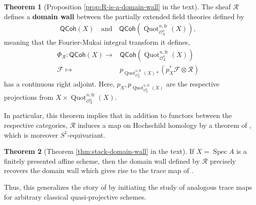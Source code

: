 \documentclass{article}
\numberwithin{equation}{section}
\theoremstyle{quest}
\theoremstyle{definition}
\newtheorem{thm}{Theorem}[section]
\theoremstyle{remark}
\DeclareMathOperator{\Spec}{Spec}
\DeclareMathOperator{\Quot}{Quot}
\begin{document}
\begin{thm}[Proposition \ref{prop:R-is-a-domain-wall} in the text]
	The sheaf $\mathscr{R}$ defines a \textbf{domain wall} between the partially extended field theories defined by
\begin{align*}
	\mathsf{QCoh}(X)\quad\text{and}\quad \mathsf{QCoh}(\Quot^{n,\text{fr}}_{\mathscr{O}_X^n}(X)),
\end{align*}
meaning that the Fourier-Mukai integral transform it defines,
\begin{align*}
	\Phi_{\mathscr{R}}:\mathsf{QCoh}(X)\to &\mathsf{QCoh}(\Quot^{n,\text{fr}}_{\mathscr{O}_X^n}(X))\\
	\mathscr{F}\mapsto &p_{\Quot^{n,\text{fr}}_{\mathscr{O}_X^n}(X)*}(p_X^*\mathscr{F}\otimes \mathscr{R})
\end{align*} 
has a continuous right adjoint. Here, $p_X,p_{\Quot^{n,\text{fr}}_{\mathscr{O}_X^n}(X)}$ are the respective projections from $X\times \Quot^{n,\text{fr}}_{\mathscr{O}_X^n}(X)$.
\end{thm} 
In particular, this theorem implies that in addition to functors between the respective categories, $\mathscr{R}$ induces a map on Hochschild homology by a theorem of \cite{nonlinear-trace}, which is moreover $S^1$-equivariant.
 
\begin{thm}[Theorem \ref{thm:stack-domain-wall} in the text]
	If $X=\Spec A$ is a finitely presented affine scheme, then the domain wall defined by $\mathscr{R}$ precisely recovers the domain wall which gives rise to the trace map of \cite{BKR}.	
\end{thm} 
Thus, this generalizes the story of \cite{BKR} by initiating the study of analogous trace maps for arbitrary classical quasi-projective schemes.
\end{document}
